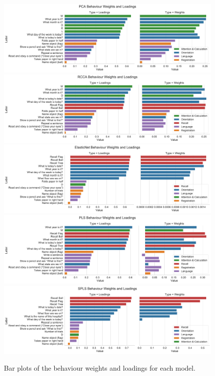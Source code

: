\begin{figure}
    \centering
    \includegraphics[width=0.8\linewidth]{figures/adni/PCA behaviour weights and loadings}
    \includegraphics[width=0.8\linewidth]{figures/adni/RCCA behaviour weights and loadings}
    \includegraphics[width=0.8\linewidth]{figures/adni/ElasticNet behaviour weights and loadings}
    \includegraphics[width=0.8\linewidth]{figures/adni/PLS behaviour weights and loadings}
    \includegraphics[width=0.8\linewidth]{figures/adni/SPLS behaviour weights and loadings}
    \caption{Bar plots of the behaviour \gls{weights} and \gls{loadings} for each model.}
\end{figure}

